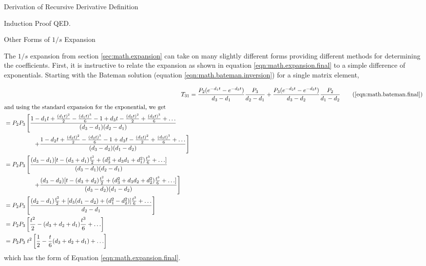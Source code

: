\begin{chapter}{Derivation of Recursive Derivative Definition\label{app:math.deriveG}}
\begin{section}{Induction Proof}
    QED.

  \end{section} %

\end{chapter} %

\begin{chapter}{Other Forms  of $1/s$ Expansion\label{app:math.1_s}}
  
  The $1/s$ expansion from section \ref{sec:math.expansion} can take
  on many slightly different forms providing different methods for
  determining the coefficients.  First, it is instructive to relate
  the expansion as shown in equation \ref{eqn:math.expansion.final} to
  a simple difference of exponentials.  Starting with the Bateman
  solution (equation \ref{eqn:math.bateman.inversion}) for a single
  matrix element,

  \begin{align}
    T_{31} &= \frac{P_2 (e^{-d_1 t} - e^{-d_3 t})}{d_3 - d_1}\frac{P_3}{d_2 - d_1} +
              \frac{P_3 (e^{-d_2 t} - e^{-d_3 t})}{d_3 - d_2}\frac{P_2}{d_1 - d_2}\tag{\ref{eqn:math.bateman.final}}\\
    \intertext{and using the standard expansion for the exponential, we get}
    \begin{split}
      &= P_2 P_3 \left [ \frac{1 - d_1 t + \frac{(d_1 t)^2}{2} - \frac{(d_1 t)^3}{6} 
              - 1 + d_3 t - \frac{(d_3 t)^2}{2} + \frac{(d_3 t)^3}{6} + \ldots }
              {(d_3 - d_1)(d_2 - d_1)} \right.\\
      &\phantom{= P_2 P_3 \left [ \right .}
              \left .\quad+\frac{1 - d_2 t + \frac{(d_2 t)^2}{2} - \frac{(d_2 t)^3}{6} 
              - 1 + d_3 t - \frac{(d_3 t)^2}{2} + \frac{(d_3 t)^3}{6} + \ldots }
              {(d_3 - d_2)(d_1 - d_2)} \right]\\
      &= P_2 P_3 \left [ \frac{(d_3 - d_1) [t - (d_3 + d_1)\frac{t^2}{2} + (d_3^2 + d_3d_1 + d_1^2)\frac{t^3}{6} + \ldots ]}
              {(d_3 - d_1)(d_2 - d_1)} \right.\\
      &\phantom{= P_2 P_3 \left [ \right .}
              \left .\quad+\frac{(d_3 - d_2) [t - (d_3 + d_2)\frac{t^2}{2} + (d_3^2 + d_3d_2 + d_2^2)\frac{t^3}{6} + \ldots ]}
              {(d_3 - d_2)(d_1 - d_2)} \right ]\\
      &= P_2 P_3 \left [ \frac{(d_2 - d_1)\frac{t^2}{2} + [d_3(d_1-d_2) + (d_1^2-d_2^2)]\frac{t^3}{6} + \ldots }
              {d_2 - d_1} \right ]\\
      &= P_2 P_3 \left [ \frac{t^2}{2} - (d_3 + d_2 + d_1) \frac{t^3}{6} + \ldots \right]\\
      &= P_2 P_3\;t^2 \left [ \frac{1}{2} - \frac{t}{6} (d_3 + d_2 + d_1) + \ldots \right]
    \end{split}
  \end{align}
  which has the form of Equation \ref{eqn:math.expansion.final}.
  

\end{chapter}
